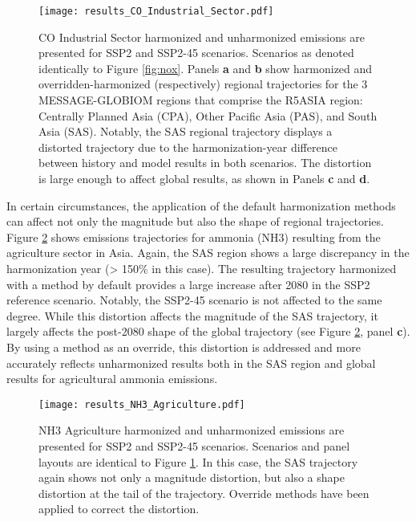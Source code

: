 \begin{figure}
  \begin{center}
    \texttt{[image: results\_CO\_Industrial\_Sector.pdf]}
    \caption[]{
      \label{fig:co}
      CO Industrial Sector harmonized and unharmonized emissions are presented
      for SSP2 and SSP2-45 scenarios. Scenarios as denoted identically to Figure
      \ref{fig:nox}. Panels \textbf{a} and \textbf{b} show harmonized and
      overridden-harmonized (respectively) regional trajectories for the 3
      MESSAGE-GLOBIOM regions that comprise the R5ASIA region: Centrally Planned
      Asia (CPA), Other Pacific Asia (PAS), and South Asia (SAS). Notably, the
      SAS regional trajectory displays a distorted trajectory due to the
      harmonization-year difference between history and model results in both
      scenarios. The distortion is large enough to affect global results, as
      shown in Panels \textbf{c} and \textbf{d}.  
}
  \end{center}
\end{figure}

In certain circumstances, the application of the default harmonization methods
can affect not only the magnitude but also the shape of regional
trajectories. Figure \ref{fig:nh3} shows emissions trajectories for ammonia
(NH3) resulting from the agriculture sector in Asia. Again, the SAS region shows
a large discrepancy in the harmonization year (> 150\% in this case). The
resulting trajectory harmonized with a  method by default
provides a large increase after 2080 in the SSP2 reference scenario. Notably,
the SSP2-45 scenario is not affected to the same degree. While this distortion
affects the magnitude of the SAS trajectory, it largely affects the post-2080
shape of the global trajectory (see Figure \ref{fig:nh3}, panel \textbf{c}). By
using a  method as an override, this distortion is
addressed and more accurately reflects unharmonized results both in the SAS
region and global results for agricultural ammonia emissions.

\begin{figure}
  \begin{center}
    \texttt{[image: results\_NH3\_Agriculture.pdf]}
    \caption[]{
      \label{fig:nh3}
      NH3 Agriculture harmonized and unharmonized emissions are presented for
      SSP2 and SSP2-45 scenarios. Scenarios and panel layouts are identical to
      Figure \ref{fig:co}. In this case, the SAS trajectory again shows not only
      a magnitude distortion, but also a shape distortion at the tail of the
      trajectory. Override methods have been applied to correct the distortion.
    }
  \end{center}
\end{figure}





